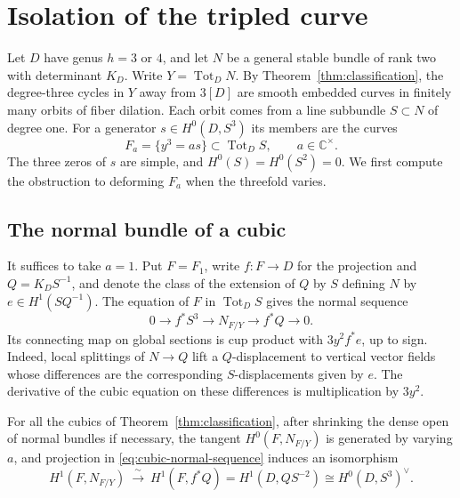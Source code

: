 \section{Isolation of the tripled curve}\label{sec:neighborhood}

Let $D$ have genus $h=3$ or $4$, and let $N$ be a general stable
bundle of rank two with determinant $K_D$. Write
$Y=\operatorname{Tot}_D N$. By Theorem~\ref{thm:classification},
the degree-three cycles in $Y$ away from $3[D]$ are smooth embedded
curves in finitely many orbits of fiber dilation. Each orbit comes
from a line subbundle $S\subset N$ of degree one. For a generator
$s\in H^0(D,S^3)$ its members are the curves
\[
                 F_a=\{y^3=a s\}\subset\operatorname{Tot}_D S,
                      \qquad a\in\mathbb C^\times.
\]
The three zeros of $s$ are simple, and $H^0(S)=H^0(S^2)=0$.
We first compute the obstruction to deforming $F_a$ when the
threefold varies.

\subsection{The normal bundle of a cubic}

It suffices to take $a=1$. Put $F=F_1$, write $f:F\to D$ for the
projection and $Q=K_DS^{-1}$, and denote the class of the extension
of $Q$ by $S$ defining $N$ by $e\in H^1(SQ^{-1})$.
The equation of $F$ in $\operatorname{Tot}_D S$ gives the normal
sequence
\begin{equation}\label{eq:cubic-normal-sequence}
 0\longrightarrow f^*S^3\longrightarrow N_{F/Y}
               \longrightarrow f^*Q\longrightarrow0 .
\end{equation}
Its connecting map on global sections is cup product with
$3y^2f^*e$, up to sign. Indeed, local splittings of
$N\to Q$ lift a $Q$-displacement to vertical vector fields whose
differences are the corresponding $S$-displacements given by $e$.
The derivative of the cubic equation on these differences is
multiplication by $3y^2$.

\begin{lemma}\label{lem:cubic-normal-cohomology}
For all the cubics of Theorem~\ref{thm:classification}, after shrinking
the dense open of normal bundles if necessary, the tangent
$H^0(F,N_{F/Y})$ is generated by varying $a$, and projection in
\eqref{eq:cubic-normal-sequence} induces an isomorphism
\[
        H^1(F,N_{F/Y})\ \xrightarrow{\ \sim\ }\ H^1(F,f^*Q)
           = H^1(D,QS^{-2}) \cong H^0(D,S^3)^\vee .
\]
\end{lemma}


